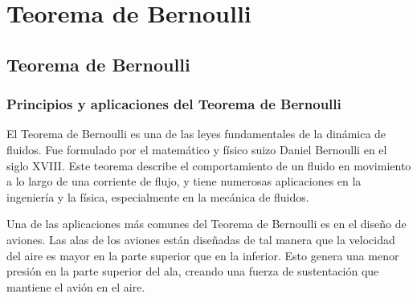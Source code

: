\documentclass[../main]{subfiles}
\begin{document}
\chapter{Teorema de Bernoulli}

\section{Teorema de Bernoulli}

\subsection{Principios y aplicaciones del Teorema de Bernoulli}

El Teorema de Bernoulli es una de las leyes fundamentales de la dinámica de fluidos. Fue formulado por el matemático y físico suizo Daniel Bernoulli en el siglo XVIII. Este teorema describe el comportamiento de un fluido en movimiento a lo largo de una corriente de flujo, y tiene numerosas aplicaciones en la ingeniería y la física, especialmente en la mecánica de fluidos.


Una de las aplicaciones más comunes del Teorema de Bernoulli es en el diseño de aviones. Las alas de los aviones están diseñadas de tal manera que la velocidad del aire es mayor en la parte superior que en la inferior. Esto genera una menor presión en la parte superior del ala, creando una fuerza de sustentación que mantiene el avión en el aire.
\end{document}
